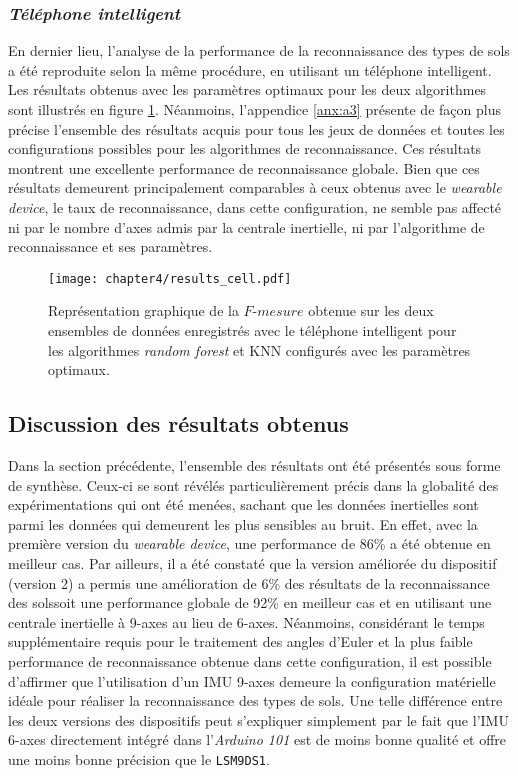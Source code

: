 \subsubsection{\textit{Téléphone intelligent}}

En dernier lieu, l'analyse de la performance de la reconnaissance des types de sols a été reproduite selon la même procédure, en utilisant un téléphone intelligent. Les résultats obtenus avec les paramètres optimaux pour les deux algorithmes sont illustrés en figure \ref{fig:results_cell}. Néanmoins, l'appendice \ref{anx:a3} présente de façon plus précise l'ensemble des résultats acquis pour tous les jeux de données et toutes les configurations possibles pour les algorithmes de reconnaissance. Ces résultats montrent une excellente performance de reconnaissance globale. Bien que ces résultats demeurent principalement comparables à ceux obtenus avec le \textit{wearable device}, le taux de reconnaissance, dans cette configuration, ne semble pas affecté ni par le nombre d'axes admis par la centrale inertielle, ni par l'algorithme de reconnaissance et ses paramètres.

\begin{figure}[t!]
	\centering
	\texttt{[image: chapter4/results\_cell.pdf]}
        \caption{Représentation graphique de la $F\mbox{-} mesure$ obtenue sur les deux ensembles de données enregistrés avec le téléphone intelligent pour les algorithmes \textit{random forest} et \acs{KNN} configurés avec les paramètres optimaux.}
	\label{fig:results_cell}
\end{figure}

\subsection{Discussion des résultats obtenus}

Dans la section précédente, l'ensemble des résultats ont été présentés sous forme de synthèse. Ceux-ci se sont révélés particulièrement précis dans la globalité des expérimentations qui ont été menées, sachant que les données inertielles sont parmi les données qui demeurent les plus sensibles au bruit. En effet, avec la première version du \textit{wearable device}, une performance de 86\% a été obtenue en meilleur cas. Par ailleurs, il a été constaté que la version améliorée du dispositif (version 2) a permis une amélioration de 6\% des résultats de la reconnaissance des sols\textemdash soit une performance globale de 92\% en meilleur cas et en utilisant une centrale inertielle à 9-axes au lieu de 6-axes. Néanmoins, considérant le temps supplémentaire requis pour le traitement des angles d'Euler et la plus faible performance de reconnaissance obtenue dans cette configuration, il est possible d'affirmer que l'utilisation d'un \acs{IMU} 9-axes demeure la configuration matérielle idéale pour réaliser la reconnaissance des types de sols. Une telle différence entre les deux versions des dispositifs peut s'expliquer simplement par le fait que l'\acs{IMU} 6-axes directement intégré dans l'\textit{Arduino 101} est de moins bonne qualité et offre une moins bonne précision que le \texttt{LSM9DS1}.

